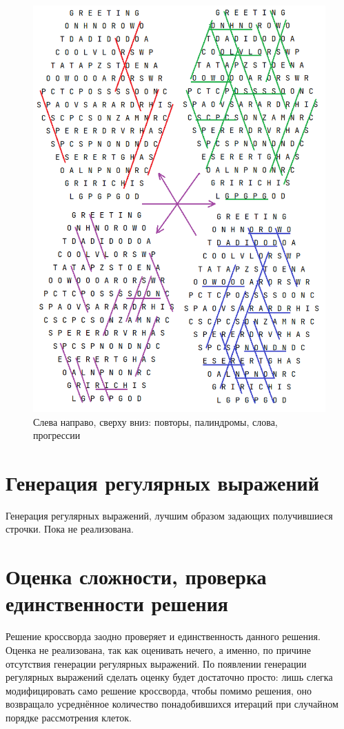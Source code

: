 \documentclass[12pt]{report}
\begin{document}
\begin{figure}[ht!]
 \centering
    \includegraphics[scale=0.9]{patterns.png}
    \caption{\label{pic:Patterns}Слева направо, сверху вниз: повторы, палиндромы, слова, прогрессии}
\end{figure}
\section{Генерация регулярных выражений} Генерация регулярных выражений, лучшим образом задающих получившиеся строчки. Пока не реализована.

\section{Оценка сложности, проверка единственности решения} Решение кроссворда заодно проверяет и единственность данного решения. Оценка не реализована, так как оценивать нечего, а именно, по причине отсутствия генерации регулярных выражений. По появлении генерации регулярных выражений сделать оценку будет достаточно просто: лишь слегка модифицировать само решение кроссворда, чтобы помимо решения, оно возвращало усреднённое количество понадобившихся итераций при случайном порядке рассмотрения клеток.
\end{document}
